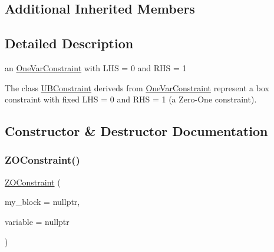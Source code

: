 \subsection*{Additional Inherited Members}


\subsection{Detailed Description}
an \mbox{\hyperlink{class_s_m_spp__di__unipi__it_1_1_one_var_constraint}{One\+Var\+Constraint}} with L\+HS = 0 and R\+HS = 1 

The class \mbox{\hyperlink{class_s_m_spp__di__unipi__it_1_1_u_b_constraint}{U\+B\+Constraint}} deriveds from \mbox{\hyperlink{class_s_m_spp__di__unipi__it_1_1_one_var_constraint}{One\+Var\+Constraint}} represent a box constraint with fixed L\+HS = 0 and R\+HS = 1 (a Zero-\/\+One constraint). 

\subsection{Constructor \& Destructor Documentation}
\mbox{\label{class_s_m_spp__di__unipi__it_1_1_z_o_constraint_a02dd3d960f5b45dcf4e11d058d0bcb72}} 
\subsubsection{\texorpdfstring{Z\+O\+Constraint()}{ZOConstraint()}}
{\footnotesize\ttfamily \mbox{\hyperlink{class_s_m_spp__di__unipi__it_1_1_z_o_constraint}{Z\+O\+Constraint}} (\begin{DoxyParamCaption}\item[{\mbox{\hyperlink{class_s_m_spp__di__unipi__it_1_1_block}{Block}} $\ast$}]{my\+\_\+block = {\ttfamily nullptr},  }\item[{\mbox{\hyperlink{class_s_m_spp__di__unipi__it_1_1_col_variable}{Col\+Variable}} $\ast$const}]{variable = {\ttfamily nullptr} }\end{DoxyParamCaption})\hspace{0.3cm}{\ttfamily [inline]}}



